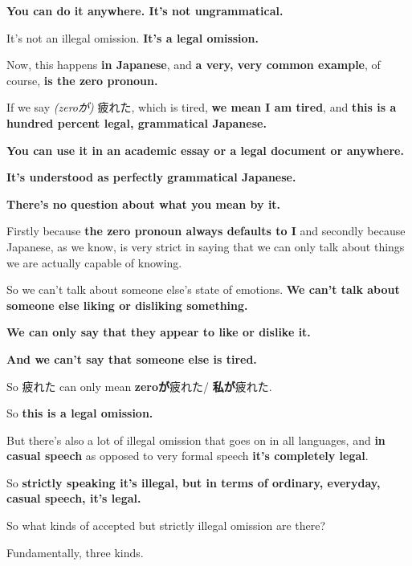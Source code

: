 {\bf You can do it anywhere. It's not ungrammatical.}

It's not an illegal omission. {\bf It's a legal omission.}

\startsectionlevel[title={The zero pronoun},reference={the-zero-pronoun}]

Now, this happens {\bf in Japanese}, and {\bf a very, very common example}, of course, {\bf is the zero pronoun.}

If we say {\em (zeroが)} 疲れた, which is tired, {\bf we mean I am tired}, and {\bf this is a hundred percent legal, grammatical Japanese.}

{}

{\bf You can use it in an academic essay or a legal document or anywhere.}

{\bf It's understood as perfectly grammatical Japanese.}

{\bf There's no question about what you mean by it.}

Firstly because {\bf the zero pronoun always defaults to I} and secondly because Japanese, as we know, is very strict in saying that we can only talk about things we are actually capable of knowing.

So we can't talk about someone else's state of emotions. {\bf We can't talk about someone else liking or disliking something.}

{\bf We can only say that they appear to like or dislike it.}

{\bf And we can't say that someone else is tired.}

So 疲れた can only mean {\bf zeroが}疲れた/ {\bf 私が}疲れた.

So {\bf this is a legal omission.}

\stopsectionlevel

\stopsectionlevel

\startsectionlevel[title={Illegal omission},reference={illegal-omission}]

But there's also a lot of illegal omission that goes on in all languages, and {\bf in casual speech} as opposed to very formal speech {\bf it's completely legal}.

So {\bf strictly speaking it's illegal, but in terms of ordinary, everyday, casual speech, it's legal.}

So what kinds of accepted but strictly illegal omission are there?

Fundamentally, three kinds.

\startsectionlevel[title={Leaving out bits of words or phrases},reference={leaving-out-bits-of-words-or-phrases}]

